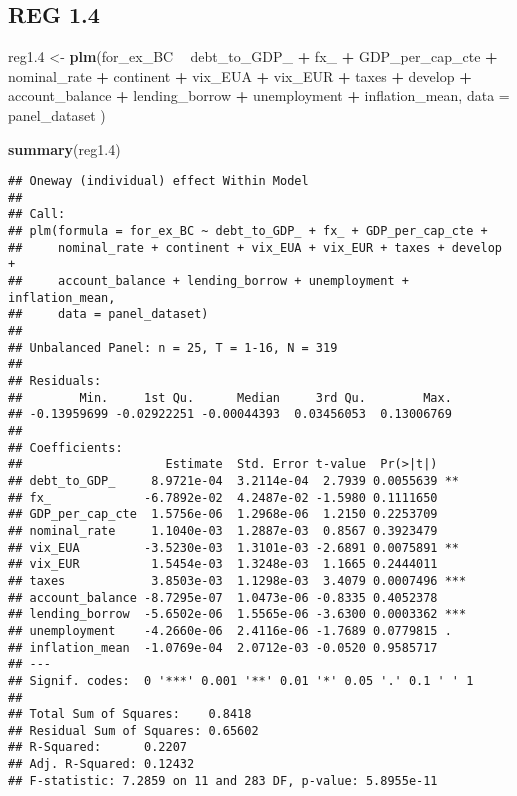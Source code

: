 \documentclass[]{article}
\newenvironment{Shaded}{\begin{snugshade}}{\end{snugshade}}
\newcommand{\KeywordTok}[1]{\textcolor[rgb]{0.13,0.29,0.53}{\textbf{#1}}}
\newcommand{\DataTypeTok}[1]{\textcolor[rgb]{0.13,0.29,0.53}{#1}}
\newcommand{\DecValTok}[1]{\textcolor[rgb]{0.00,0.00,0.81}{#1}}
\newcommand{\StringTok}[1]{\textcolor[rgb]{0.31,0.60,0.02}{#1}}
\newcommand{\OperatorTok}[1]{\textcolor[rgb]{0.81,0.36,0.00}{\textbf{#1}}}
\newcommand{\NormalTok}[1]{#1}
\begin{document}
\subsection{REG 1.4}\label{reg-1.4}

\begin{Shaded}
\begin{Highlighting}[]
\NormalTok{reg1.}\DecValTok{4}\NormalTok{ <-}\StringTok{ }\KeywordTok{plm}\NormalTok{(for_ex_BC }\OperatorTok{~}\StringTok{ }\NormalTok{debt_to_GDP_ }\OperatorTok{+}\StringTok{ }\NormalTok{fx_ }\OperatorTok{+}\StringTok{ }\NormalTok{GDP_per_cap_cte }\OperatorTok{+}\StringTok{ }\NormalTok{nominal_rate }\OperatorTok{+}\StringTok{ }\NormalTok{continent }\OperatorTok{+}\StringTok{ }\NormalTok{vix_EUA }\OperatorTok{+}\StringTok{ }\NormalTok{vix_EUR }\OperatorTok{+}\StringTok{ }\NormalTok{taxes }\OperatorTok{+}\StringTok{ }\NormalTok{develop }\OperatorTok{+}\StringTok{ }\NormalTok{account_balance }\OperatorTok{+}\StringTok{ }\NormalTok{lending_borrow }\OperatorTok{+}\StringTok{ }\NormalTok{unemployment }\OperatorTok{+}\StringTok{ }\NormalTok{inflation_mean, }\DataTypeTok{data =}\NormalTok{ panel_dataset )}

\KeywordTok{summary}\NormalTok{(reg1.}\DecValTok{4}\NormalTok{)}
\end{Highlighting}
\end{Shaded}

\begin{verbatim}
## Oneway (individual) effect Within Model
## 
## Call:
## plm(formula = for_ex_BC ~ debt_to_GDP_ + fx_ + GDP_per_cap_cte + 
##     nominal_rate + continent + vix_EUA + vix_EUR + taxes + develop + 
##     account_balance + lending_borrow + unemployment + inflation_mean, 
##     data = panel_dataset)
## 
## Unbalanced Panel: n = 25, T = 1-16, N = 319
## 
## Residuals:
##        Min.     1st Qu.      Median     3rd Qu.        Max. 
## -0.13959699 -0.02922251 -0.00044393  0.03456053  0.13006769 
## 
## Coefficients:
##                    Estimate  Std. Error t-value  Pr(>|t|)    
## debt_to_GDP_     8.9721e-04  3.2114e-04  2.7939 0.0055639 ** 
## fx_             -6.7892e-02  4.2487e-02 -1.5980 0.1111650    
## GDP_per_cap_cte  1.5756e-06  1.2968e-06  1.2150 0.2253709    
## nominal_rate     1.1040e-03  1.2887e-03  0.8567 0.3923479    
## vix_EUA         -3.5230e-03  1.3101e-03 -2.6891 0.0075891 ** 
## vix_EUR          1.5454e-03  1.3248e-03  1.1665 0.2444011    
## taxes            3.8503e-03  1.1298e-03  3.4079 0.0007496 ***
## account_balance -8.7295e-07  1.0473e-06 -0.8335 0.4052378    
## lending_borrow  -5.6502e-06  1.5565e-06 -3.6300 0.0003362 ***
## unemployment    -4.2660e-06  2.4116e-06 -1.7689 0.0779815 .  
## inflation_mean  -1.0769e-04  2.0712e-03 -0.0520 0.9585717    
## ---
## Signif. codes:  0 '***' 0.001 '**' 0.01 '*' 0.05 '.' 0.1 ' ' 1
## 
## Total Sum of Squares:    0.8418
## Residual Sum of Squares: 0.65602
## R-Squared:      0.2207
## Adj. R-Squared: 0.12432
## F-statistic: 7.2859 on 11 and 283 DF, p-value: 5.8955e-11
\end{verbatim}
\end{document}
